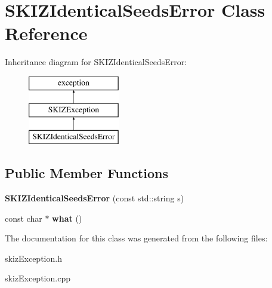 \hypertarget{classSKIZIdenticalSeedsError}{}\section{S\+K\+I\+Z\+Identical\+Seeds\+Error Class Reference}
\label{classSKIZIdenticalSeedsError}
Inheritance diagram for S\+K\+I\+Z\+Identical\+Seeds\+Error\+:\begin{figure}[H]
\begin{center}
\leavevmode
\includegraphics[height=3.000000cm]{classSKIZIdenticalSeedsError}
\end{center}
\end{figure}
\subsection*{Public Member Functions}
\begin{DoxyCompactItemize}
\item 
\mbox{\label{classSKIZIdenticalSeedsError_ad68bf97f113410a5828ec6e35b090289}} 
{\bfseries S\+K\+I\+Z\+Identical\+Seeds\+Error} (const std\+::string s)
\item 
\mbox{\label{classSKIZIdenticalSeedsError_a57ea5631e452d3ea80041f631ae6dd9d}} 
const char $\ast$ {\bfseries what} ()
\end{DoxyCompactItemize}


The documentation for this class was generated from the following files\+:\begin{DoxyCompactItemize}
\item 
skiz\+Exception.\+h\item 
skiz\+Exception.\+cpp\end{DoxyCompactItemize}
